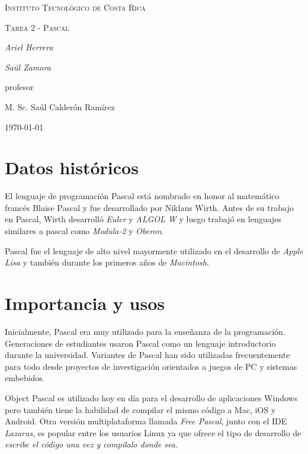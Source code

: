 \documentclass{IEEEtran}
\begin{document}
\begin{titlepage}
  \centering
  {\scshape\LARGE Instituto Tecnol\'ogico de Costa Rica \par}
  \vspace{1cm}
  {\scshape\Large Tarea 2 - Pascal\par}
  \vspace{1.5cm}
  {\Large\itshape Ariel Herrera\par}
  {\Large\itshape Sa\'ul Zamora\par}
  \vfill
  profesor\par
  M. Sc. Sa\'ul Calder\'on Ram\'irez \textsc{}

  \vfill

  {\large \today\par}
\end{titlepage}

\section{Datos hist\'oricos}
El lenguaje de programaci\'on Pascal est\'a nombrado en honor al matem\'atico franc\'es Blaise Pascal y fue desarrollado por Niklaus Wirth. Antes de su trabajo en Pascal, Wirth desarroll\'o \emph{Euler} y \emph{ALGOL W} y luego trabaj\'o en lenguajes similares a pascal como \emph{Modula-2} y \emph{Oberon}.

Pascal fue el lenguaje de alto nivel mayormente utilizado en el desarrollo de \emph{Apple Lisa} y tambi\'en durante los primeros a\~nos de \emph{Macintosh}.

\section{Importancia y usos}
Inicialmente, Pascal era muy utilizado para la ense\~nanza de la programaci\'on. Generaciones de estudiantes usaron Pascal como un lenguaje introductorio durante la universidad. Variantes de Pascal han sido utilizadas frecuentemente para todo desde proyectos de investigaci\'on orientados a juegos de PC y sistemas embebidos.

Object Pascal es utilizado hoy en d\'ia para el desarrollo de aplicaciones Windows pero tambi\'en tiene la habilidad de compilar el mismo c\'odigo a Mac, iOS y Android. Otra versi\'on multiplataforma llamada \emph{Free Pascal}, junto con el IDE \emph{Lazarus}, es popular entre los usuarios Linux ya que ofrece el tipo de desarrollo de \emph{escribe el c\'odigo una vez y compilalo donde sea}.
\end{document}
